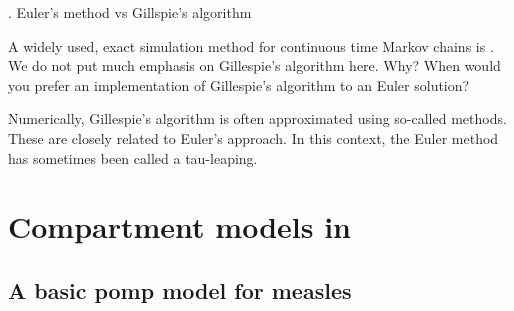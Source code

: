 %
%
%
%
%
%
%
%
%

\begin{frame}{\myexercise. Euler's method vs Gillspie's algorithm}

  A widely used, exact simulation method for continuous time Markov chains is  .
  We do not put much emphasis on Gillespie's algorithm here. Why? When would you prefer an implementation of Gillespie's algorithm to an Euler solution?

  \vspace{3mm}


  \vspace{3mm}

  Numerically, Gillespie's algorithm is often approximated using so-called
  methods. These are closely related to Euler's approach. In this context, the Euler method has sometimes been called a tau-leaping.



\end{frame}

\section{Compartment models in }

\subsection{A basic pomp model for measles}

